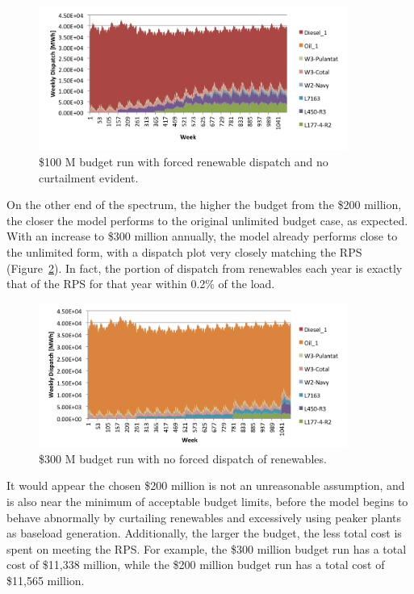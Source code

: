\documentclass[12pt,letterpaper,fleqn]{article}
\begin{document}
\begin{figure}[!h]
  \centering
  \includegraphics[width=0.9\textwidth]{img/budget_100_forced}
  \caption{\$100 M budget run with forced renewable dispatch and no
    curtailment evident.}
  \label{fig:budget_100_forced}
\end{figure}

On the other end of the spectrum, the higher the budget from the \$200
million, the closer the model performs to the original unlimited
budget case, as expected. With an increase to \$300 million annually,
the model already performs close to the unlimited form, with a
dispatch plot very closely matching the RPS
(Figure~\ref{fig:budget_300_not_forced}). In fact, the portion of
dispatch from renewables each year is exactly that of the RPS for that
year within 0.2\% of the load.

\begin{figure}[!h]
  \centering
  \includegraphics[width=0.9\textwidth]{img/budget_300_not_forced}
  \caption{\$300 M budget run with no forced dispatch of renewables.}
  \label{fig:budget_300_not_forced}
\end{figure}

It would appear the chosen \$200 million is not an unreasonable 
assumption, and is also near the minimum of acceptable budget limits,
before the model begins to behave abnormally by curtailing renewables
and excessively using peaker plants as baseload
generation. Additionally, the larger the budget, the less total cost
is spent on meeting the RPS. For example, the \$300 million budget run
has a total cost of \$11,338 million, while the \$200 million budget
run has a total cost of \$11,565 million.
\end{document}
